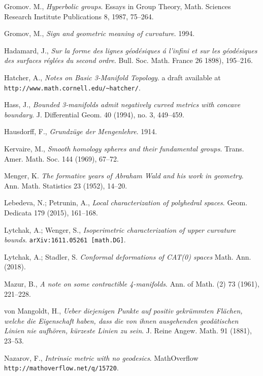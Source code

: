 \begin{thebibliography}{52}
Gromov. M.,
\textit{Hyperbolic groups}. 
Essays in Group Theory,
Math. Sciences Research Institute Publications 8,
1987, 75--264.

Gromov, M.,
\textit{Sign and geometric meaning of curvature}.
1994.

Hadamard, J.,
\textit{Sur la forme des lignes g\'eod\'esiques \'a l'infini et sur les g\'eod\'esiques des surfaces r\'egl\'ees du second ordre}.
Bull. Soc. Math. France 
26 
1898), 
195--216.

Hatcher, A., 
\textit{Notes on Basic 3-Manifold Topology}.
a draft available at \verb+http://www.math.cornell.edu/~hatcher/+.

Hass, J.,
\textit{Bounded 3-manifolds admit negatively curved metrics with concave boundary}.
J. Differential Geom. 
40 (1994), 
no. 3, 
449--459. 

Hausdorff, F., 
\textit{Grundz\"uge der Mengenlehre}. 
1914.

Kervaire, M., 
\textit{Smooth homology spheres and their fundamental groups}.
Trans. Amer. Math. Soc. 
144 
(1969),
67--72.

Menger, K.
\textit{The formative years of Abraham Wald and his work in geometry}.
Ann. Math. Statistics 23 (1952), 14--20.

Lebedeva, N.; 
Petrunin, A., 
\textit{Local characterization of polyhedral spaces}.
Geom. Dedicata 179 (2015), 161--168.

Lytchak, A.; Wenger, S.,
\textit{Isoperimetric characterization of upper curvature bounds}.
\texttt{arXiv:1611.05261 [math.DG]}.

Lytchak, A.; Stadler, S. 
\textit{Conformal deformations of CAT(0) spaces}
Math. Ann. (2018). 

Mazur, B.,
\textit{A note on some contractible 4-manifolds}.
Ann. of Math. (2) 
73 
(1961),
221--228.

von Mangoldt, H., 
\textit{Ueber diejenigen Punkte auf positiv gekr\"ummten Fl\"achen, welche die Eigenschaft haben, dass die von ihnen ausgehenden geod\"atischen Linien nie aufh\"oren, k\"urzeste Linien zu sein}.
J. Reine Angew. Math. 91 (1881), 23--53.

Nazarov, F.,
\textit{Intrinsic metric with no geodesics}.
MathOverflow \texttt{http://mathoverflow.net/q/15720}.


\end{thebibliography}
